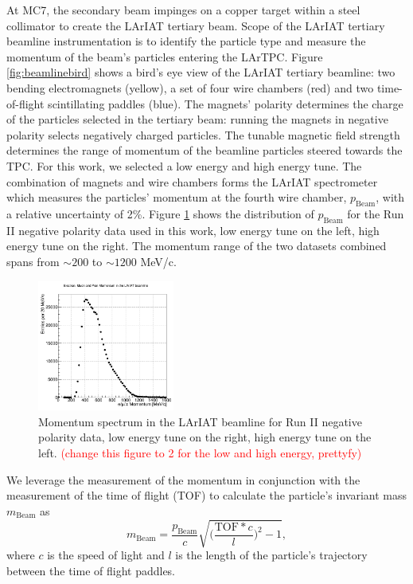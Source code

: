 \documentclass[aps,prl,twocolumn,showpacs,superscriptaddress,groupedaddress]{revtex4}  %
\begin{document}
At MC7, the secondary beam impinges  on a copper target within a steel collimator to create the LArIAT tertiary beam. Scope of the LArIAT tertiary beamline instrumentation is to identify the particle type and measure the momentum of the beam's particles entering the LArTPC. Figure \ref{fig:beamlinebird} shows a bird's eye view of the LArIAT tertiary beamline:  two bending electromagnets (yellow), a set of four wire chambers (red) and two time-of-flight scintillating paddles (blue).  The magnets' polarity determines the charge of the particles selected in the tertiary beam: running the magnets in negative polarity selects negatively charged particles. The tunable magnetic field strength determines the range of momentum of the beamline particles steered towards the TPC. For this work, we selected a low energy and high energy tune. 
The combination of magnets and wire chambers forms the LArIAT spectrometer which measures the particles' momentum at the fourth wire chamber, $p_{\text{Beam}}$, with a relative uncertainty of 2\%. Figure \ref{fig:momentum} shows the distribution of  $p_{\text{Beam}}$ for the Run II negative polarity data used in this work, low energy tune on the left, high energy tune on the right. The momentum range of the two datasets combined spans from $\sim200$ to $\sim1200$ MeV/c. 
\begin{figure}
  \centering  
\includegraphics[width =0.4\textwidth]{momentumPiMuE.png}
\caption{Momentum spectrum in the LArIAT beamline  for Run II negative polarity data, low energy tune on the right, high energy tune on the left. \textcolor{red}{(change this figure to 2 for the low and high energy, prettyfy)}}
\label{fig:momentum}
\end{figure}



We leverage the measurement of the momentum in conjunction with the measurement of the time of flight (TOF) to calculate the particle's invariant mass $m_{\text{Beam}}$ as 
\begin{equation}
m_{\text{Beam}} = \frac{p_{\text{Beam}}}{c}\sqrt{\biggl(\frac{\text{TOF}*c}{l}\biggr)^2 -1},
\label{eq:mass}
\end{equation}
 where $c$ is the speed of light and $l$ is the length of the particle's trajectory between the time of flight paddles. 
\end{document}
